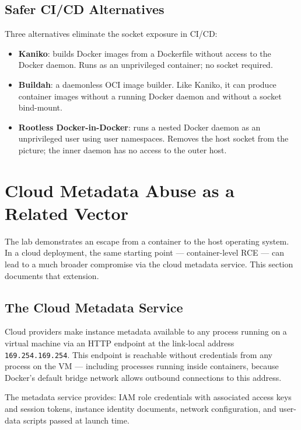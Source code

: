 \subsection{Safer CI/CD Alternatives}

Three alternatives eliminate the socket exposure in CI/CD:

\begin{itemize}
    \item \textbf{Kaniko}: builds Docker images from a Dockerfile without access to the Docker daemon. Runs as an unprivileged container; no socket required.
    \item \textbf{Buildah}: a daemonless OCI image builder. Like Kaniko, it can produce container images without a running Docker daemon and without a socket bind-mount.
    \item \textbf{Rootless Docker-in-Docker}: runs a nested Docker daemon as an unprivileged user using user namespaces. Removes the host socket from the picture; the inner daemon has no access to the outer host.
\end{itemize}


\section{Cloud Metadata Abuse as a Related Vector}

The lab demonstrates an escape from a container to the host operating system. In a cloud deployment, the same starting point --- container-level RCE --- can lead to a much broader compromise via the cloud metadata service. This section documents that extension.

\subsection{The Cloud Metadata Service}

Cloud providers make instance metadata available to any process running on a virtual machine via an HTTP endpoint at the link-local address \texttt{169.254.169.254}. This endpoint is reachable without credentials from any process on the VM --- including processes running inside containers, because Docker's default bridge network allows outbound connections to this address.

The metadata service provides: IAM role credentials with associated access keys and session tokens, instance identity documents, network configuration, and user-data scripts passed at launch time.

